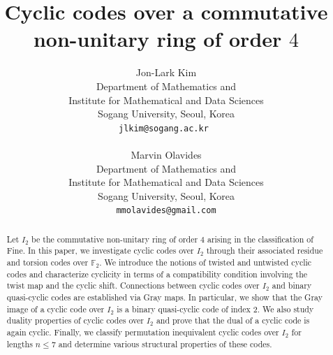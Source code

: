\documentclass[12pt]{article}
\theoremstyle{definition}
\theoremstyle{plain}
\begin{document}
\title{Cyclic codes over a commutative non-unitary ring of order $4$\footnotemark[1]}
	


\author{Jon-Lark Kim\footnotemark[2]   \\ Department of Mathematics and \\ Institute for Mathematical and Data Sciences  \\ Sogang University, Seoul, Korea \\
		{\tt jlkim@sogang.ac.kr } \\
			\\ Marvin Olavides  \\ Department of Mathematics and \\ Institute for Mathematical and Data Sciences  \\ Sogang University, Seoul, Korea \\
		{\tt mmolavides@gmail.com}   
	}
\date{}
	
\maketitle



\begin{abstract}
Let $I_2$ be the commutative non-unitary ring of order $4$ arising in the classification of Fine. In this paper, we investigate cyclic codes over $I_2$ through their associated residue and torsion codes over $\mathbb{F}_2$. We introduce the notions of twisted and untwisted cyclic codes and characterize cyclicity in terms of a compatibility condition involving the twist map and the cyclic shift. Connections between cyclic codes over $I_2$ and binary quasi-cyclic codes are established via Gray maps. In particular, we show that the Gray image of a cyclic code over $I_2$ is a binary quasi-cyclic code of index $2$. We also study duality properties of cyclic codes over $I_2$ and prove that the dual of a cyclic code is again cyclic. Finally, we classify permutation inequivalent cyclic codes over $I_2$ for lengths $n \le 7$ and determine various structural properties of these codes.
\end{abstract}
\end{document}
